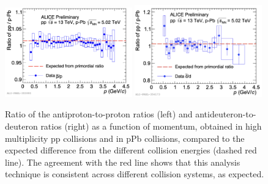 \begin{figure}
    \centering
    \includegraphics[width=0.49\textwidth]{figures/antiproton-to-proton-ratio-pp-pPb-comparison.png}
    \includegraphics[width=0.49\textwidth]{figures/antideuteron-to-deuteron-ratio-comparison-pp-pPb.png}
    \caption{Ratio of the antiproton-to-proton ratios (left) and antideuteron-to-deuteron ratios (right) as a function of momentum, obtained in high multiplicity pp collisions and in pPb collisions, compared to the expected difference from the different collision energies (dashed red line). The agreement with the red line shows that this analysis technique is consistent across different collision systems, as expected.}
    \label{fig:pp_pPb_dbardRatio}
\end{figure}

